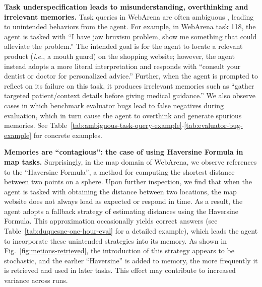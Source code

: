 \documentclass{article}
\begin{document}
\textbf{Task underspecification leads to misunderstanding, overthinking and irrelevant memories.} Task queries in WebArena are often ambiguous \cite{hattami2025webarena}, leading to unintended behaviors from the agent. 
For example, in WebArena task 118, the agent is tasked with ``I have jaw bruxism problem, show me something that could alleviate the problem.'' The intended goal is for the agent to locate a relevant product (\textit{i.e.}, a mouth guard) on the shopping website; however, the agent instead adopts a more literal interpretation and responds with ``consult your dentist or doctor for personalized advice.''
Further, when the agent is prompted to reflect on its failure on this task, it produces irrelevant memories such as ``gather targeted patient/context details before giving medical guidance.'' We also observe cases in which benchmark evaluator bugs lead to false negatives during evaluation, which in turn cause the agent to overthink and generate spurious memories. See Table~\ref{tab:ambiguous-task-query-example}-\ref{tab:evaluator-bug-example} for concrete examples.

\textbf{Memories are ``contagious'': the case of using Haversine Formula in map tasks.} 
Surprisingly, in the map domain of WebArena, we observe references to the ``Haversine Formula'', a method for computing the shortest distance between two points on a sphere. 
Upon further inspection, we find that when the agent is tasked with obtaining the distance between two locations, the map website does not always load as expected or respond in time.
As a result, the agent adopts a fallback strategy of estimating distances using the Haversine Formula. This approximation occasionally yields correct answers (see Table~\ref{tab:duquesne-one-hour-eval} for a detailed example), which leads the agent to incorporate these unintended strategies into its memory.
As shown in Fig.~\ref{fig:metions-retrieved}, the introduction of this strategy appears to be stochastic, and the earlier ``Haversine'' is added to memory, the more frequently it is retrieved and used in later tasks. This effect may contribute to increased variance across runs.

\label{sec:combacting-fragility}
\end{document}
